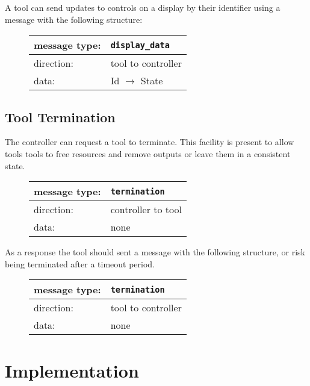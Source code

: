 \documentclass{article}
\newcommand{\msg}[1]{\texttt{#1}}
\begin{document}
   \noindent A tool can send updates to controls on a display by their
   identifier using a message with the following structure:

   \begin{figure}[H]
    \begin{tabular}{|ll|}
     \hline
      message type:   & \msg{display\_data} \\
     \hline
      direction:      & tool to controller \\
      data:           & Id $\rightarrow$ State \\
     \hline
    \end{tabular}
   \end{figure}

  \subsection{Tool Termination}

   \noindent The controller can request a tool to terminate. This facility is present to
   allow tools tools to free resources and remove outputs or leave them in a
   consistent state.

   \begin{figure}[H]
    \begin{tabular}{|ll|}
     \hline
      message type:    & \msg{termination} \\
     \hline
      direction:       & controller to tool \\
      data:            & none \\
     \hline
    \end{tabular}
   \end{figure}

   \noindent As a response the tool should sent a message with the following
   structure, or risk being terminated after a timeout period.

   \begin{figure}[H]
    \begin{tabular}{|ll|}
     \hline
      message type:   & \msg{termination} \\
     \hline
      direction:      & tool to controller \\
      data:           & none \\
     \hline
    \end{tabular}
   \end{figure}

 \section{Implementation} \label{s:implementation}
\end{document}
